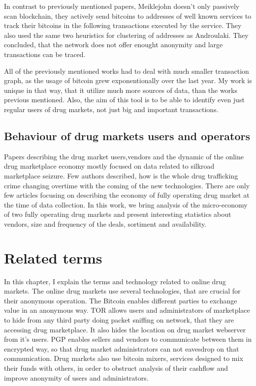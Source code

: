 \documentclass[
  digital, %
  table,   %
  lof,     %
  lot,     %
  oneside
]{fithesis3}
\begin{document}
In contrast to previously mentioned papers, Meiklejohn \parencite{meiklejohn2013fistful} 
doesn't only passively scan blockchain, they actively send bitcoins to addresses of
well known services to track their bitcoins in the following transactions executed by the service.
They also used the same two heuristics for clustering of addresses
as Androulaki. \parencite{androulaki2013evaluating}
They concluded, that the network does not offer enought anonymity and large transactions can be traced.

All of the previously mentioned works had to deal with much smaller transaction graph, as the usage of bitcoin grew exponentionally over the last year. 
My work is unique in that way, that it utilize much more sources of data, than the works previous mentioned. Also, the aim of this tool is to be able
to identify even just regular users of drug markets, not just big and important transactions.

\section{Behaviour of drug markets users and operators}

Papers describing the drug market users,vendors and the dynamic of
the online drug marketplace economy mostly focused on data related to silkroad marketplace seizure. 
Few authors described, how is the whole drug trafficking crime changing overtime with the coming of the new technologies.
There are only few articles focusing on describing the economy of fully operating drug market at the time of data collection.
In this work, we bring analysis of the micro-economy of two fully operating drug markets and present interesting statistics about vendors,
size and frequency of the deals, sortiment and availability.

\chapter{Related terms}

In this chapter, I explain the terms and technology related to online drug markets.
The online drug markets use several technologies, that are crucial for their anonymous operation.
The Bitcoin enables different parties to exchange value in an anonymous way.
TOR allows users and administrators of marketplace to hide from any third party doing packet sniffing on network,
that they are accessing drug marketplace. It also hides the location on drug market webserver from it's users.
PGP enables sellers and vendors to communicate between them in encrypted way,
so that drug market administrators can not eavesdrop on that communication.
Drug markets also use bitcoin mixers, services designed to mix their funds with others, in order to obstruct
analysis of their cashflow and improve anonymity of users and administrators.
\end{document}

